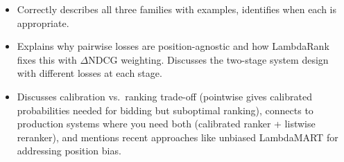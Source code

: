 \begin{interviewq}

\goodgreat
\begin{itemize}
    \item {} Correctly describes all three families with examples, identifies when each is appropriate.
    \item {} Explains why pairwise losses are position-agnostic and how LambdaRank fixes this with $\Delta\text{NDCG}$ weighting. Discusses the two-stage system design with different losses at each stage.
    \item {} Discusses calibration vs.\ ranking trade-off (pointwise gives calibrated probabilities needed for bidding but suboptimal ranking), connects to production systems where you need both (calibrated ranker + listwise reranker), and mentions recent approaches like unbiased LambdaMART for addressing position bias.
\end{itemize}

\end{interviewq}

